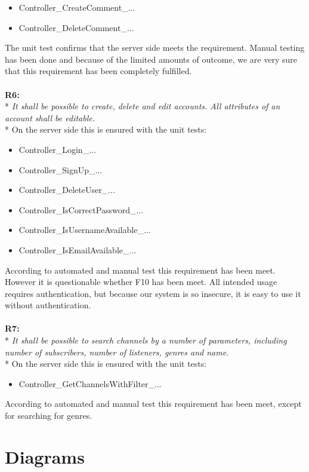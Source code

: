 \documentclass[a4paper,11pt,report]{article}
\begin{document}
{\begin{itemize}
\item Controller\_CreateComment\_...
\item Controller\_DeleteComment\_...
\end{itemize}
The unit test confirms that the server side meets the requirement. Manual testing has been done and because of the limited amounts of outcome, we are very sure that this requirement has been completely fulfilled. \\ \\
\textbf{R6:} \\*
\textit{It shall be possible to create, delete and edit accounts. All attributes of an account shall be editable.} \\*
On the server side this is ensured with the unit tests:
\begin{itemize}
\item Controller\_Login\_...
\item Controller\_SignUp\_...
\item Controller\_DeleteUser\_...
\item Controller\_IsCorrectPassword\_...
\item Controller\_IsUsernameAvailable\_...
\item Controller\_IsEmailAvailable\_...
\end{itemize}
According to automated and manual test this requirement has been meet. However it is questionable whether F10 has been meet. All intended usage requires authentication, but because our system is so insecure, it is easy to use it without authentication. \\ \\
\textbf{R7:} \\*
\textit{It shall be possible to search channels by a number of parameters, including number of subscribers, number of listeners, genres and name.} \\*
On the server side this is ensured with the unit tests:
\begin{itemize}
\item Controller\_GetChannelsWithFilter\_...
\end{itemize}
According to automated and manual test this requirement has been meet, except for searching for genres.
\newpage
\section{Diagrams}

}
\end{document}
